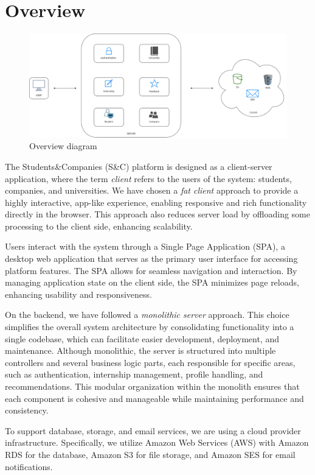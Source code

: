 \section{Overview}

\begin{figure}[!ht]
    \centering
    \includegraphics[scale=0.30]{Images/ImagesDD/overview.png}
    \caption{Overview diagram}
\end{figure}

The Students\&Companies (S\&C) platform is designed as a client-server application, where the term \textit{client} refers to the users of the system: students, companies, and universities. We have chosen a \textit{fat client} approach to provide a highly interactive, app-like experience, enabling responsive and rich functionality directly in the browser. This approach also reduces server load by offloading some processing to the client side, enhancing scalability.

Users interact with the system through a Single Page Application (SPA), a desktop web application that serves as the primary user interface for accessing platform features. The SPA allows for seamless navigation and interaction. By managing application state on the client side, the SPA minimizes page reloads, enhancing usability and responsiveness.

On the backend, we have followed a \textit{monolithic server} approach. This choice simplifies the overall system architecture by consolidating functionality into a single codebase, which can facilitate easier development, deployment, and maintenance. Although monolithic, the server is structured into multiple controllers and several business logic parts, each responsible for specific areas, such as authentication, internship management, profile handling, and recommendations. This modular organization within the monolith ensures that each component is cohesive and manageable while maintaining performance and consistency.

To support database, storage, and email services, we are using a cloud provider infrastructure. Specifically, we utilize Amazon Web Services (AWS) with Amazon RDS for the database, Amazon S3 for file storage, and Amazon SES for email notifications.


